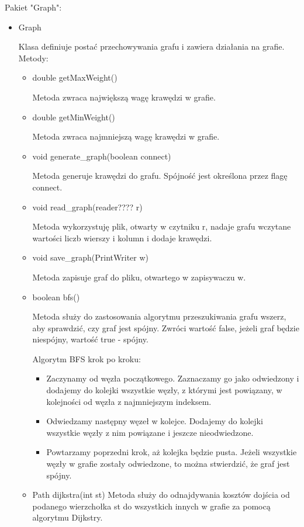 \documentclass[]{article}
\begin{document}
Pakiet "Graph":
\begin{itemize}
    \item Graph
    
    Klasa definiuje postać przechowywania grafu i zawiera działania na grafie.
    Metody:
    \begin{itemize}
        \item double getMaxWeight()
        
        Metoda zwraca największą wagę krawędzi w grafie.
        \item double getMinWeight()
        
        Metoda zwraca najmniejszą wagę krawędzi w grafie.
        \item void generate\_graph(boolean connect)
        
        Metoda generuje krawędzi do grafu. Spójność jest określona przez flagę connect.
        \item void read\_graph(reader???? r)
        
        Metoda wykorzystuję plik, otwarty w czytniku r, nadaje grafu wczytane wartości liczb wierszy i kolumn i dodaje krawędzi.
        \item void save\_graph(PrintWriter w)
        
        Metoda zapisuje graf do pliku, otwartego w zapisywaczu w.
        \item boolean bfs()
        
        Metoda służy do zastosowania algorytmu przeszukiwania grafu wszerz, aby sprawdzić, czy graf jest spójny. Zwróci wartość false, jeżeli graf będzie niespójny, wartość true - spójny.
        
        Algorytm BFS krok po kroku:
        \begin{itemize}
            \item Zaczynamy od węzła początkowego. Zaznaczamy go jako odwiedzony i dodajemy do kolejki wszystkie węzły, z którymi jest powiązany, w kolejności od węzła z najmniejszym indeksem.
            \item Odwiedzamy następny węzeł w kolejce. Dodajemy do kolejki wszystkie węzły z nim powiązane i jeszcze nieodwiedzone.
            \item Powtarzamy poprzedni krok, aż kolejka będzie pusta. Jeżeli wszystkie węzły w grafie zostały odwiedzone, to można stwierdzić, że graf jest spójny.
        \end{itemize}
        \item Path dijkstra(int st)
        Metoda służy do odnajdywania kosztów dojścia od podanego wierzchołka st do wszystkich innych w grafie za pomocą algorytmu Dijkstry.
        

\end{itemize}
\end{itemize}
\end{document}
